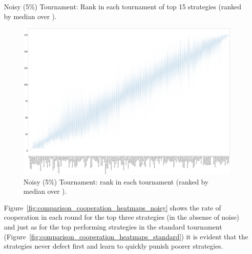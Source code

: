 \documentclass{article}
\begin{document}
\begin{table}[!hbtp]
    \centering
        
        \caption{Noisy (5\%) Tournament: Rank in each tournament
        of top 15 strategies (ranked by median over
        \protecttournaments).}
        \label{tbl:noisy_ranks}
\end{table}

\begin{landscape}
    \begin{figure}[!hbtp]
        \centering
        \includegraphics[width=\paperwidth]{./assets/noisy_ranks_boxplots.pdf}
        \caption{Noisy (5\%) Tournament: rank in each tournament (ranked by
        median over
        \protecttournaments).}
        \label{fig:noisy_ranks_boxplot}
    \end{figure}
\end{landscape}

Figure~\ref{fig:comparison_cooperation_heatmaps_noisy} shows the rate of
cooperation in each round for the top three strategies (in the absense of noise)
and just as for the top performing strategies in the standard tournament
(Figure~\ref{fig:comparison_cooperation_heatmaps_standard}) it is evident that
the strategies never defect first and learn to quickly punish poorer strategies.
\end{document}
